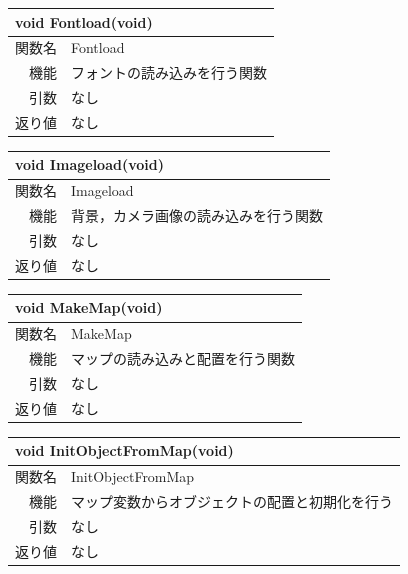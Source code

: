 \documentclass{jarticle}
\begin{document}
\begin{table}[H]
\begin{tabular}{|r|l|}
\hline
\multicolumn{2}{|l|}{void Fontload(void)}       \\ \hline
関数名           & Fontload \\ \hline
機能     & フォントの読み込みを行う関数 \\
引数     & なし \\
返り値   & なし \\ \hline
\end{tabular}
\end{table}

\begin{table}[H]
\begin{tabular}{|r|l|}
\hline
\multicolumn{2}{|l|}{void Imageload(void)}       \\ \hline
関数名   & Imageload \\ \hline
機能     & 背景，カメラ画像の読み込みを行う関数 \\
引数     & なし \\
返り値   & なし \\ \hline
\end{tabular}
\end{table}



\begin{table}[H]
\begin{tabular}{|r|l|}
\hline
\multicolumn{2}{|l|}{void MakeMap(void)}       \\ \hline
関数名   & MakeMap \\ \hline
機能     & マップの読み込みと配置を行う関数 \\
引数     & なし \\
返り値   & なし \\ \hline
\end{tabular}
\end{table}

\begin{table}[H]
\begin{tabular}{|r|l|}
\hline
\multicolumn{2}{|l|}{void InitObjectFromMap(void)}       \\ \hline
関数名   & InitObjectFromMap \\ \hline
機能     & マップ変数からオブジェクトの配置と初期化を行う \\
引数     & なし \\
返り値   & なし \\ \hline
\end{tabular}
\end{table}
\end{document}
